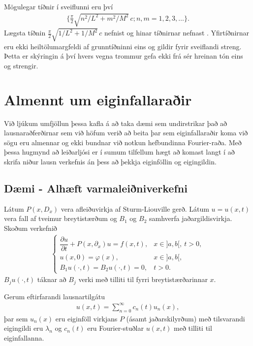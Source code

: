 \documentclass[a4paper,10pt,icelandic]{sphinxmanual}
\begin{document}
Mögulegar tíðnir í sveiflunni eru því
\begin{equation*}
\begin{split}\{\tfrac \pi 2\sqrt{n^2/L^2+m^2/M^2}\, c; n,m=1,2,3,\dots\}.\end{split}
\end{equation*}
Lægsta tíðnin \(\frac \pi 2\sqrt{1/L^2+1/M^2}\, c\) nefnist
 og hinar tíðnirnar nefnast . Yfirtíðnirnar eru ekki heiltölumargfeldi af grunntíðninni eins og gildir fyrir sveiflandi streng.  Þetta er skýringin á því hvers vegna trommur gefa ekki frá sér hreinan tón eins og strengir.


\section{Almennt um eiginfallaraðir}
\label{\detokenize{Kafli03:almennt-um-eiginfallarair}}
Við ljúkum umfjöllun þessa kafla á að taka dæmi sem undirstrikar það að lausnaraðferðirnar sem við höfum verið að beita þar sem eiginfallaraðir koma við sögu eru almennar og ekki bundnar við notkun hefbundinna Fourier-raða. Með þessa hugmynd að leiðarljósi er í sumum tilfellum hægt að komast langt í að skrifa niður lausn verkefnis án þess að þekkja eiginföllin og eigingildin.


\subsection{Dæmi - Alhæft varmaleiðniverkefni}
\label{\detokenize{Kafli03:daemi-alhaeft-varmaleiniverkefni}}
Látum \(P(x,D_x)\) vera afleiðuvirkja af Sturm-Liouville gerð. Látum \(u = u(x,t)\) vera fall af tveimur breytistærðum og \(B_1\) og \(B_2\) samhverfa jaðargildisvirkja. Skoðum verkefnið
\begin{equation*}
\begin{split}\begin{cases}
 \dfrac{\partial u}{\partial t}+P(x,\partial_x)u=f(x,t),
 &x\in ]a,b[, \ t>0,\\
 u(x,0)=\varphi(x), & x\in ]a,b[,\\
 B_1u(\cdot,t)=B_2u(\cdot,t)=0, &t>0.
 \end{cases}\end{split}
\end{equation*}
\(B_ju(\cdot,t)\) táknar að \(B_j\) verki með tilliti til fyrri breytistærðarinnar \(x\).

Gerum eftirfarandi lausnartilgátu
\begin{equation*}
\begin{split}u(x,t)=\sum\limits_{n=0}^{\infty} c_n(t)u_n(x),\end{split}
\end{equation*}
þar sem \(u_n(x)\) eru eiginföll virkjans \(P\) (ásamt jaðarskilyrðum) með tilsvarandi eigingildi eru \(\lambda_n\) og \(c_n(t)\) eru Fourier-stuðlar \(u(x,t)\) með tilliti til eiginfallanna.
\end{document}
